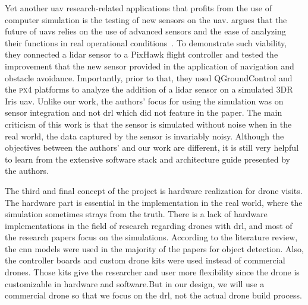 \documentclass[../main.tex]{subfiles}
\begin{document}
Yet another \gls{uav} research-related applications 
that profits from the use of computer simulation 
is the testing of new sensors on the \gls{uav}.
\citeauthor{Gar20} argues that the future of \glspl{uav}
relies on the use of advanced sensors and 
the ease of analyzing their functions
in real operational conditions~\cite{Gar20}.
To demonstrate such viability, they connected a \gls{lidar} sensor
to a PixHawk flight controller and tested the improvement
that the new sensor provided
in the application of navigation and obstacle avoidance.
Importantly, prior to that, they used QGroundControl and the \textsc{px4}
platforms to analyze the addition of a \gls{lidar} sensor
on a simulated 3DR Iris \gls{uav}.
Unlike our work, the authors' focus for using the simulation
was on sensor integration and not \gls{drl} 
which did not feature in the paper. 
The main criticism of this work is that 
the sensor is simulated without noise
when in the real world, the data captured
by the sensor is invariably noisy.
Although the objectives between the authors' and our work
are different, it is still very helpful to learn from
the extensive software stack and architecture guide 
presented by the authors.


		The third and final concept of the project is hardware realization for drone visits.
		The hardware part is essential in the implementation in the real world, where the simulation sometimes strays from the truth.
		There is a lack of hardware implementations in the field of research regarding drones with \gls{drl}, and most of the research papers focus on the simulations.
		According to the literature review, the \gls{cnn} models were used in the majority of the papers for object detection. 
		Also, the controller boards and custom drone kits were used instead of commercial drones.
		Those kits give the researcher and user more flexibility since the drone is customizable 
		in hardware and software.But in our design, we will use a commercial drone so that we focus
		 on the \gls{drl}, not the actual drone build process. 

\end{document}
